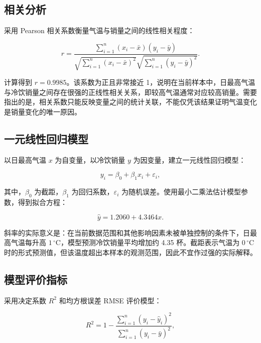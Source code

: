 \documentclass[UTF8,12pt,a4paper]{ctexart}
\begin{document}
\subsection{相关分析}

采用 Pearson 相关系数衡量气温与销量之间的线性相关程度：

\begin{equation}
    r=\frac{\sum_{i=1}^{n}(x_i-\bar{x})(y_i-\bar{y})}
    {\sqrt{\sum_{i=1}^{n}(x_i-\bar{x})^2}\sqrt{\sum_{i=1}^{n}(y_i-\bar{y})^2}}.
\end{equation}

计算得到 $r=0.9985$。该系数为正且非常接近 1，说明在当前样本中，日最高气温与冷饮销量之间存在很强的正线性相关关系，即较高气温通常对应较高销量。需要指出的是，相关系数只能反映变量之间的统计关联，不能仅凭该结果证明气温变化是销量变化的唯一原因。

\subsection{一元线性回归模型}

以日最高气温 $x$ 为自变量，以冷饮销量 $y$ 为因变量，建立一元线性回归模型：

\begin{equation}
    y_i=\beta_0+\beta_1x_i+\varepsilon_i,
\end{equation}

其中，$\beta_0$ 为截距，$\beta_1$ 为回归系数，$\varepsilon_i$ 为随机误差。使用最小二乘法估计模型参数，得到拟合方程：

\begin{equation}
    \hat{y}=1.2060+4.3464x.
\end{equation}

斜率的实际意义是：在当前数据范围和其他影响因素未被单独控制的条件下，日最高气温每升高 $1\,^{\circ}$C，模型预测冷饮销量平均增加约 4.35 杯。截距表示气温为 $0\,^{\circ}$C 时的形式预测值，但该温度超出本样本的观测范围，因此不宜作过强的实际解释。

\subsection{模型评价指标}

采用决定系数 $R^2$ 和均方根误差 RMSE 评价模型：

\begin{equation}
    R^2=1-\frac{\sum_{i=1}^{n}(y_i-\hat{y}_i)^2}
    {\sum_{i=1}^{n}(y_i-\bar{y})^2},
\end{equation}
\end{document}
